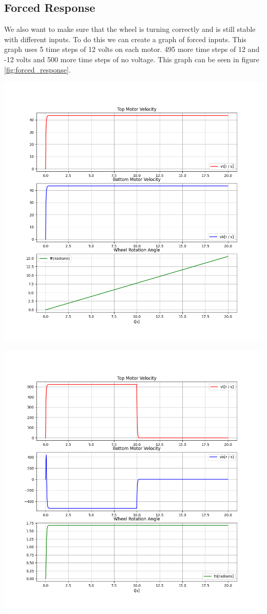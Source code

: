 \documentclass{scrartcl}
\begin{document}
\subsection{Forced Response}
We also want to make sure that the wheel is turning correctly and is still stable with different inputs. To do this we can create a graph of forced inputs. This graph uses 5 time steps of 12 volts on each motor. 495 more time steps of 12 and -12 volts and 500 more time steps of no voltage. This graph can be seen in figure \ref{fig:forced_response}.

\begin{minipage}{.45\textwidth}
    \centering
    \includegraphics[width=\textwidth]{step_response.png}
    \label{fig:step_response}
\end{minipage}
\begin{minipage}{.45\textwidth}
    \centering
    \includegraphics[width=\textwidth]{forced_response.png}
    \label{fig:forced_response}
\end{minipage}

\newpage
\end{document}
